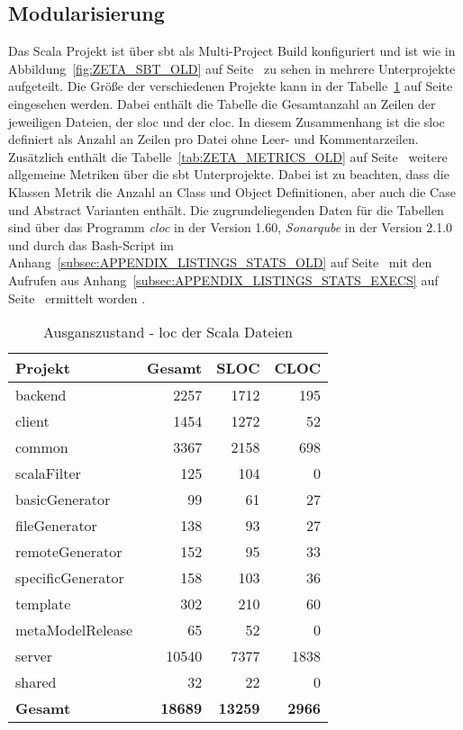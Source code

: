 \subsection{Modularisierung}
\label{subsec:REVIEW_MODULES}

Das Scala Projekt ist über \ac{sbt} als Multi-Project Build konfiguriert und ist wie in Abbildung~\ref{fig:ZETA_SBT_OLD} auf Seite~\pageref{fig:ZETA_SBT_OLD} zu sehen in mehrere Unterprojekte aufgeteilt. Die Größe der verschiedenen Projekte kann in der Tabelle~\ref{tab:ZETA_METRICS_LOC_OLD} auf Seite~\pageref{tab:ZETA_METRICS_LOC_OLD} eingesehen werden. Dabei enthält die Tabelle die Gesamtanzahl an Zeilen der jeweiligen Dateien, der \ac{sloc} und der \ac{cloc}. In diesem Zusammenhang ist die \ac{sloc} definiert als Anzahl an Zeilen pro Datei ohne Leer- und Kommentarzeilen. Zusätzlich enthält die Tabelle~\ref{tab:ZETA_METRICS_OLD} auf Seite~\pageref{tab:ZETA_METRICS_OLD} weitere allgemeine Metriken über die \ac{sbt} Unterprojekte. Dabei ist zu beachten, dass die Klassen Metrik die Anzahl an Class und Object Definitionen, aber auch die Case und Abstract Varianten enthält. Die zugrundeliegenden Daten für die Tabellen sind über das Programm \textit{cloc} in der Version 1.60, \textit{Sonarqube} in der Version 2.1.0 und durch das Bash-Script im Anhang~\ref{subsec:APPENDIX_LISTINGS_STATS_OLD} auf Seite~\pageref{subsec:APPENDIX_LISTINGS_STATS_OLD} mit den Aufrufen aus Anhang~\ref{subsec:APPENDIX_LISTINGS_STATS_EXECS} auf Seite~\pageref{subsec:APPENDIX_LISTINGS_STATS_EXECS} ermittelt worden \cite{cloc}.

\begin{table}[ht]
    \smallskip
    \centering
    \begin{tabular}{| l | r | r | r |}
    \hline
    \bf Projekt & \bf Gesamt & \bf SLOC & \bf CLOC \\ \hline
    backend & 2257 & 1712 & 195 \\ \hline
    client & 1454 & 1272 & 52 \\ \hline
    common & 3367 & 2158 & 698 \\ \hline
    scalaFilter & 125 & 104 & 0 \\ \hline
    basicGenerator & 99 & 61 & 27 \\ \hline
    fileGenerator & 138 & 93 & 27 \\ \hline
    remoteGenerator & 152 & 95 & 33 \\ \hline
    specificGenerator & 158 & 103 & 36 \\ \hline
    template & 302 & 210 & 60 \\ \hline
    metaModelRelease & 65 & 52 & 0 \\ \hline
    server & 10540 & 7377 & 1838 \\ \hline
    shared & 32 & 22 & 0 \\ \hline
    \bf Gesamt & \bf 18689 & \bf 13259 & \bf 2966 \\ \hline
    \end{tabular}
    \caption{Ausganszustand - \ac{loc} der Scala Dateien \cite{analys_old_directory}}
    \label{tab:ZETA_METRICS_LOC_OLD}
\end{table}

